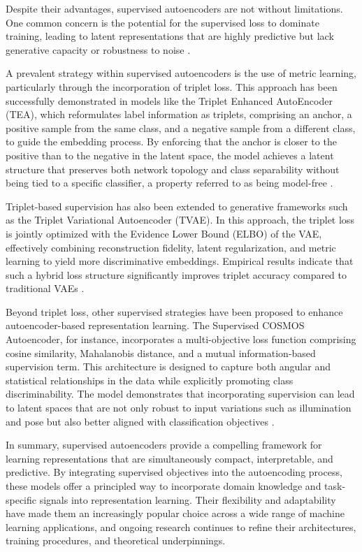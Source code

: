 Despite their advantages, supervised autoencoders are not without limitations. One common concern is the potential for the supervised loss to dominate training, leading to latent representations that are highly predictive but lack generative capacity or robustness to noise \cite{Le18}.

A prevalent strategy within supervised autoencoders is the use of metric learning, particularly through the incorporation of triplet loss. This approach has been successfully demonstrated in models like the Triplet Enhanced AutoEncoder (TEA), which reformulates label information as triplets, comprising an anchor, a positive sample from the same class, and a negative sample from a different class, to guide the embedding process. By enforcing that the anchor is closer to the positive than to the negative in the latent space, the model achieves a latent structure that preserves both network topology and class separability without being tied to a specific classifier, a property referred to as being model-free \cite{Yang19}.

Triplet-based supervision has also been extended to generative frameworks such as the Triplet Variational Autoencoder (TVAE). In this approach, the triplet loss is jointly optimized with the Evidence Lower Bound (ELBO) of the VAE, effectively combining reconstruction fidelity, latent regularization, and metric learning to yield more discriminative embeddings. Empirical results indicate that such a hybrid loss structure significantly improves triplet accuracy compared to traditional VAEs \cite{Ishfaq23}.

Beyond triplet loss, other supervised strategies have been proposed to enhance autoencoder-based representation learning. The Supervised COSMOS Autoencoder, for instance, incorporates a multi-objective loss function comprising cosine similarity, Mahalanobis distance, and a mutual information-based supervision term. This architecture is designed to capture both angular and statistical relationships in the data while explicitly promoting class discriminability. The model demonstrates that incorporating supervision can lead to latent spaces that are not only robust to input variations such as illumination and pose but also better aligned with classification objectives \cite{Singh18}.

In summary, supervised autoencoders provide a compelling framework for learning representations that are simultaneously compact, interpretable, and predictive. By integrating supervised objectives into the autoencoding process, these models offer a principled way to incorporate domain knowledge and task-specific signals into representation learning. Their flexibility and adaptability have made them an increasingly popular choice across a wide range of machine learning applications, and ongoing research continues to refine their architectures, training procedures, and theoretical underpinnings.

